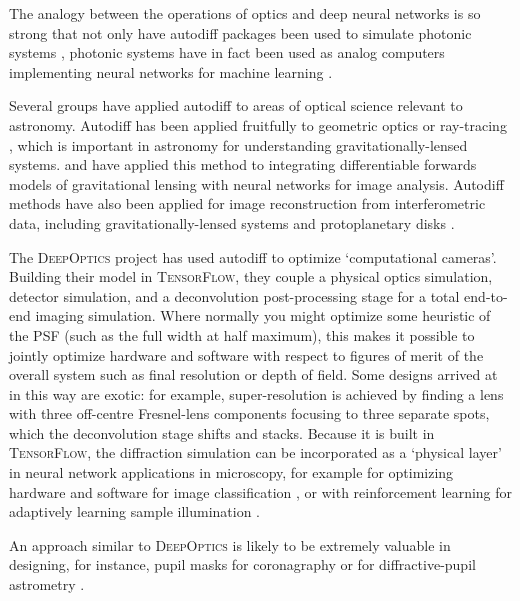 \documentclass[modern]{aastex63}
\begin{document}
The analogy between the operations of optics and deep neural networks is so strong that not only have autodiff packages been used to simulate photonic systems \citep[e.g.][]{hughes18}, photonic systems have in fact been used as analog computers implementing neural networks for machine learning \citep{hughes19,guo19}. 

Several groups have applied autodiff to areas of optical science relevant to astronomy. Autodiff has been applied fruitfully to geometric optics or ray-tracing \citep[e.g.][]{werner2012,sutin16}, which is important in astronomy for understanding gravitationally-lensed systems. \citet{chianese19} and \citet{morningstar19} have applied this method to integrating differentiable forwards models of gravitational lensing with neural networks for image analysis. Autodiff methods have also been applied for image reconstruction from interferometric data, including gravitationally-lensed systems \citep{morningstar18} and protoplanetary disks \citep{czekala19}.

The \textsc{DeepOptics} project \citep{sitzmann2018} has used autodiff to optimize `computational cameras'. Building their model in \textsc{TensorFlow}, they couple a physical optics simulation, detector simulation, and a deconvolution post-processing stage for a total end-to-end imaging simulation. Where normally you might optimize some heuristic of the PSF (such as the full width at half maximum), this makes it possible to jointly optimize hardware and software with respect to figures of merit of the overall system such as final resolution or depth of field. Some designs arrived at in this way are exotic: for example, super-resolution is achieved by finding a lens with three off-centre Fresnel-lens components focusing to three separate spots, which the deconvolution stage shifts and stacks. Because it is built in \textsc{TensorFlow}, the diffraction simulation can be incorporated as a `physical layer' in neural network applications in microscopy, for example for optimizing hardware and software for image classification \citep{muthumbi19}, or with reinforcement learning for adaptively learning sample illumination \citet{chaware19}.

An approach similar to \textsc{DeepOptics} is likely to be extremely valuable in designing, for instance, pupil masks for coronagraphy \citep[e.g.][]{guyon03,carlotti11} or for diffractive-pupil astrometry \citep[e.g.][]{guyon12,tuthill18}. 
\end{document}
